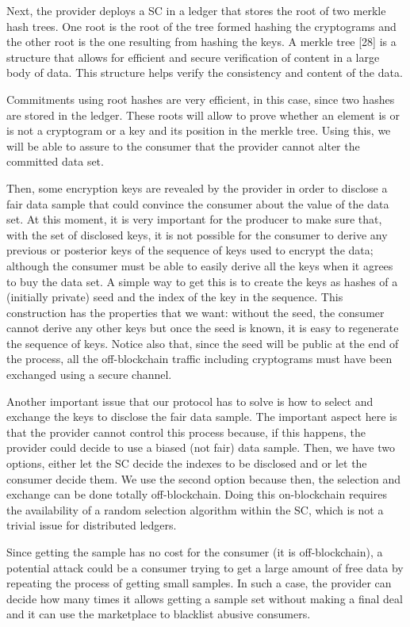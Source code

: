 \documentclass[]{article}
\begin{document}
	Next, the provider deploys a SC in a ledger that stores the root of two merkle hash trees. One root is the root of the tree formed hashing the cryptograms and the other root is the one resulting from hashing the keys. A merkle tree [28] is a structure that allows for efficient and secure verification of content in a large body of data. This structure helps verify the consistency and content of the data.

	Commitments using root hashes are very efficient, in this case, since two hashes are stored in the ledger. These roots will allow to prove whether an element is or is not a cryptogram or a key and its position in the merkle tree. Using this, we will be able to assure to the consumer that the provider cannot alter the committed data set.

	Then, some encryption keys are revealed by the provider in order to disclose a fair data sample that could convince the consumer about the value of the data set. At this moment, it is very important for the producer to make sure that, with the set of disclosed keys, it is not possible for the consumer to derive any previous or posterior keys of the sequence of keys used to encrypt the data; although the consumer must be able to easily derive all the keys when it agrees to buy the data set. A simple way to get this is to create the keys as hashes of a (initially private) seed and the index of the key in the sequence. This construction has the properties that we want: without the seed, the consumer cannot derive any other keys but once the seed is known, it is easy to regenerate the sequence of keys. Notice also that, since the seed will be public at the end of the process, all the off-blockchain traffic including cryptograms must have been exchanged using a secure channel.

	Another important issue that our protocol has to solve is how to select and exchange the keys to disclose the fair data sample. The important aspect here is that the provider cannot control this process because, if this happens, the provider could decide to use a biased (not fair) data sample. Then, we have two options, either let the SC decide the indexes to be disclosed and or let the consumer decide them. We use the second option because then, the selection and exchange can be done totally off-blockchain. Doing this on-blockchain requires the availability of a random selection algorithm within the SC, which is not a trivial issue for distributed ledgers.

	Since getting the sample has no cost for the consumer (it is off-blockchain), a potential attack could be a consumer trying to get a large amount of free data by repeating the process of getting small samples. In such a case, the provider can decide how many times it allows getting a sample set without making a final deal and it can use the marketplace to blacklist abusive consumers.
\end{document}
